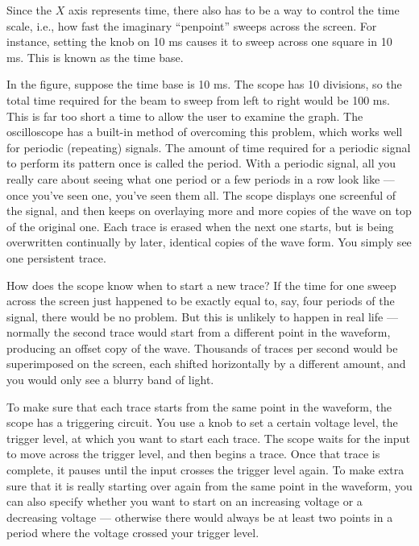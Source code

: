 
Since the $X$ axis represents time, there also has to be a way
to control the time scale, i.e., how fast the imaginary
``penpoint'' sweeps across the screen. For instance, setting
the knob on 10 ms causes it to sweep across one square
in 10 ms. This is known as the time base.

In the figure, suppose the time base is 10 ms.
The scope has 10
divisions, so the total time required for the beam to sweep
from left to right would be 100 ms. This is far too short a
time to allow the user to examine the graph.
The oscilloscope has a built-in method of overcoming this
problem, which works well for periodic (repeating)
signals. The amount of
time required for a periodic signal to perform its pattern
once is called the period. With a periodic signal, all you
really care about seeing what one period or a few periods in
a row look like --- once you've seen one, you've seen them
all. The scope displays one screenful of the
signal, and then keeps on overlaying more and more copies of
the wave on top of the original one. Each
trace is erased when the next one starts, but is being overwritten
continually by later, identical copies of the wave form. You
simply see one persistent trace.\label{fig:em-osc-waveform} %

How does the scope know when to start a new trace? If the
time for one sweep across the screen just happened to be
exactly equal to, say, four periods of the signal, there
would be no problem. But this is unlikely to happen in real
life --- normally the second trace would start from a
different point in the waveform, producing an offset copy of
the wave. Thousands of traces per second would be superimposed
on the screen, each shifted horizontally by a different
amount, and you would only see a blurry band of light.

To make sure that each trace starts from the same point in
the waveform, the scope has a triggering circuit. You use a
knob to set a certain voltage level, the trigger level, at
which you want to start each trace. The scope waits for the
input to move across the trigger level, and then begins a
trace. Once that trace is complete, it pauses until the
input crosses the trigger level again. To make extra sure
that it is really starting over again from the same point in
the waveform, you can also specify whether you want to start
on an increasing voltage or a decreasing voltage ---
otherwise there would always be at least two points in a
period where the voltage crossed your trigger level.

